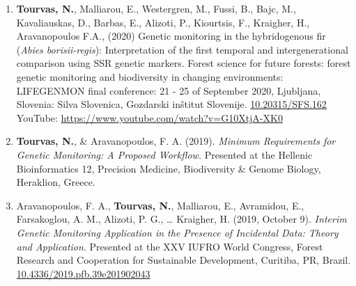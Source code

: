 \documentclass[12pt,]{scrartcl}
\begin{document}
\begin{enumerate}
\item \textbf{Tourvas, N.}, Malliarou, E., Westergren, M., Fussi, B., Bajc, M., Kavaliauskas, D., Barbas, E., Alizoti, P., Kiourtsis, F., Kraigher, H., Aravanopoulos F.A., (2020) Genetic monitoring in the hybridogenous fir (\textit{Abies borisii-regis}): Interpretation of the first temporal and intergenerational comparison using SSR genetic markers. Forest science for future forests: forest genetic monitoring and biodiversity in changing environments: LIFEGENMON final conference: 21 - 25 of September 2020, Ljubljana, Slovenia: Silva Slovenica, Gozdarski inštitut Slovenije. \href{http://doi.org/10.20315/SFS.162}{10.20315/SFS.162}
\newline
YouTube: \href{https://www.youtube.com/watch?v=G10XtjA-XK0}{https://www.youtube.com/watch?v=G10XtjA-XK0}


\item \textbf{Tourvas, N.}, \& Aravanopoulos, F. A. (2019). \textit{Minimum Requirements for Genetic Monitoring: A Proposed Workflow.} Presented at the Hellenic Bioinformatics 12, Precision Medicine, Biodiversity \& Genome Biology, Heraklion, Greece.

\item Aravanopoulos, F. A., \textbf{Tourvas, N.}, Malliarou, E., Avramidou, E., Farsakoglou, A. M., Alizoti, P. G., … Kraigher, H. (2019, October 9). \textit{Interim Genetic Monitoring Application in the Presence of Incidental Data: Theory and Application}. Presented at the XXV IUFRO World Congress, Forest Research and Cooperation for Sustainable Development, Curitiba, PR, Brazil. \href{https://doi.org/10.4336/2019.pfb.39e201902043}{10.4336/2019.pfb.39e201902043}



\end{enumerate}
\end{document}
